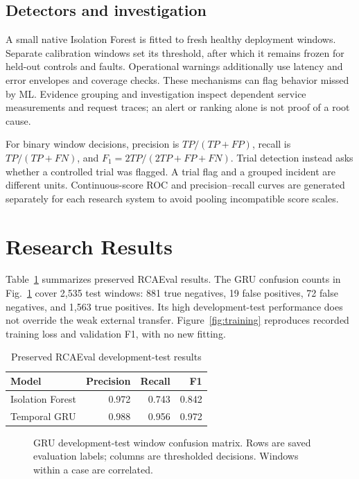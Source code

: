\documentclass[conference]{IEEEtran}
\begin{document}
\subsection{Detectors and investigation}
A small native Isolation Forest is fitted to fresh healthy deployment windows. Separate calibration windows set its threshold, after which it remains frozen for held-out controls and faults. Operational warnings additionally use latency and error envelopes and coverage checks. These mechanisms can flag behavior missed by ML. Evidence grouping and investigation inspect dependent service measurements and request traces; an alert or ranking alone is not proof of a root cause.

For binary window decisions, precision is $TP/(TP+FP)$, recall is $TP/(TP+FN)$, and $F_1=2TP/(2TP+FP+FN)$. Trial detection instead asks whether a controlled trial was flagged. A trial flag and a grouped incident are different units. Continuous-score ROC and precision--recall curves are generated separately for each research system to avoid pooling incompatible score scales.

\section{Research Results}
Table~\ref{tab:research} summarizes preserved RCAEval results. The GRU confusion counts in Fig.~\ref{fig:confusion} cover 2,535 test windows: 881 true negatives, 19 false positives, 72 false negatives, and 1,563 true positives. Its high development-test performance does not override the weak external transfer. Figure~\ref{fig:training} reproduces recorded training loss and validation F1, with no new fitting.

\begin{table}[t]\centering
\caption{Preserved RCAEval development-test results}\label{tab:research}
\begin{tabular}{lrrr}\toprule
Model & Precision & Recall & F1\\\midrule
Isolation Forest & 0.972 & 0.743 & 0.842\\
Temporal GRU & 0.988 & 0.956 & 0.972\\\bottomrule
\end{tabular}
\end{table}

\begin{figure}[t]\centering
{}
\caption{GRU development-test window confusion matrix. Rows are saved evaluation labels; columns are thresholded decisions. Windows within a case are correlated.}\label{fig:confusion}
\end{figure}
\end{document}
